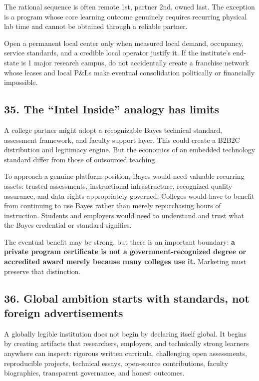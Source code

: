The rational sequence is often remote 1st, partner 2nd, owned last. The exception is a program whose core learning outcome genuinely requires recurring physical lab time and cannot be obtained through a reliable partner.

Open a permanent local center only when measured local demand, occupancy, service standards, and a credible local operator justify it. If the institute's end-state is 1 major research campus, do not accidentally create a franchise network whose leases and local P\&Ls make eventual consolidation politically or financially impossible.

\subsection{35. The ``Intel Inside'' analogy has limits}

A college partner might adopt a recognizable Bayes technical standard, assessment framework, and faculty support layer. This could create a B2B2C distribution and legitimacy engine. But the economics of an embedded technology standard differ from those of outsourced teaching.

To approach a genuine platform position, Bayes would need valuable recurring assets: trusted assessments, instructional infrastructure, recognized quality assurance, and data rights appropriately governed. Colleges would have to benefit from continuing to use Bayes rather than merely repurchasing hours of instruction. Students and employers would need to understand and trust what the Bayes credential or standard signifies.

The eventual benefit may be strong, but there is an important boundary: \textbf{a private program certificate is not a government-recognized degree or accredited award merely because many colleges use it.} Marketing must preserve that distinction.

\subsection{36. Global ambition starts with standards, not foreign advertisements}

A globally legible institution does not begin by declaring itself global. It begins by creating artifacts that researchers, employers, and technically strong learners anywhere can inspect: rigorous written curricula, challenging open assessments, reproducible projects, technical essays, open-source contributions, faculty biographies, transparent governance, and honest outcomes.

